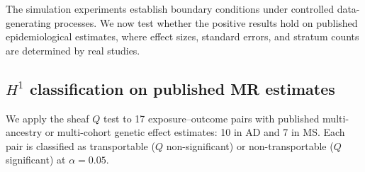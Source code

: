 \documentclass{article}
\begin{document}
The simulation experiments establish boundary conditions under controlled data-generating processes. We now test whether the positive results hold on published epidemiological estimates, where effect sizes, standard errors, and stratum counts are determined by real studies.

\subsection{$H^1$ classification on published MR estimates}
\label{sec:realdata-h1}

We apply the sheaf $Q$ test to 17 exposure--outcome pairs with published multi-ancestry or multi-cohort genetic effect estimates: 10 in AD and 7 in MS. Each pair is classified as transportable ($Q$ non-significant) or non-transportable ($Q$ significant) at $\alpha = 0.05$.
\end{document}
